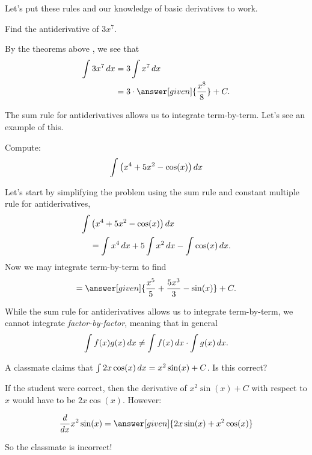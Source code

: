 \documentclass{ximera}
\begin{document}
Let's put these rules and our knowledge of basic derivatives to work.
\begin{example}
Find the antiderivative of $3 x^7$.
\begin{explanation}
	By the theorems above , we see that
\begin{align*}
\int 3 x^7 \d x &= 3 \int x^7 \d x\\
&= 3 \cdot \answer[given]{\frac{x^8}{8}}+C.
\end{align*}
\end{explanation}
\end{example}
The sum rule for antiderivatives allows us to integrate
term-by-term. Let's see an example of this.

\begin{example}
Compute:
\[
\int \left(x^4 + 5x^2 - \cos(x)\right) \mathop{}\!d x
\]
\begin{explanation}
Let's start by simplifying the problem using the sum rule 
 and constant multiple rule for antiderivatives, 
\begin{align*}
\int &\left(x^4 + 5x^2 - \cos(x)\right) \mathop{}\!d x\\
&= \int x^4 \mathop{}\!d x + 5\int x^2 \mathop{}\!d x - \int \cos(x) \mathop{}\!d x.
\end{align*}
Now we may integrate term-by-term to find
\[
= \answer[given]{\frac{x^5}{5} + \frac{5x^3}{3}  - \sin(x)}+C.
\]
\end{explanation}
\end{example}


\begin{warning}
While the sum rule for antiderivatives allows us to integrate
term-by-term, we cannot integrate \textit{factor-by-factor}, meaning
that in general
\[
\int f(x)g(x) \mathop{}\!d x \ne \int f(x) \mathop{}\!d x\cdot \int g(x) \mathop{}\!d x.
\]
\end{warning}


\begin{example}
  A classmate claims that $\int 2x \cos(x) \mathop{}\!d x = x^2 \sin(x) +C$. Is this correct?
  
  \begin{explanation}
    If the student were correct, then the derivative of $x^2 \sin(x) +C$ with respect to $x$ would have to be $2x \cos(x)$.  However:
    
      \[\ddx x^2 \sin(x) = \answer[given]{2x \sin(x) +x^2 \cos(x)} \]
      
So the classmate is incorrect!
  \end{explanation}
\end{example}
\end{document}
